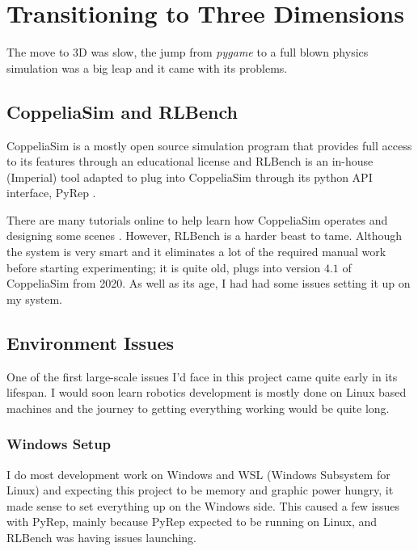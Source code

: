 \section{Transitioning to Three Dimensions}
The move to 3D was slow, the jump from \emph{pygame} to a full blown physics simulation was a big leap and it came with its problems.

\subsection{CoppeliaSim and RLBench}

CoppeliaSim is a mostly open source simulation program that provides full access to its features through an educational license and RLBench \cite{james2019rlbenchrobotlearningbenchmark} is an in-house (Imperial) tool adapted to plug into CoppeliaSim through its python API interface, PyRep \cite{pyrep2020}. 

There are many tutorials online to help learn how CoppeliaSim operates and designing some scenes . However, RLBench is a harder beast to tame. Although the system is very smart and it eliminates a lot of the required manual work before starting experimenting; it is quite old, plugs into version $4.1$ of CoppeliaSim from 2020. As well as its age, I had had some issues setting it up on my system. 

\subsection{Environment Issues}
One of the first large-scale issues I'd face in this project came quite early in its lifespan. I would soon learn robotics development is mostly done on Linux based machines and the journey to getting everything working would be quite long.

\subsubsection{Windows Setup}
I do most development work on Windows and WSL (Windows Subsystem for Linux) \cite{microsoftWSL} and expecting this project to be memory and graphic power hungry, it made sense to set everything up on the Windows side. This caused a few issues with PyRep, mainly because PyRep expected to be running on Linux, and RLBench was having issues launching.

